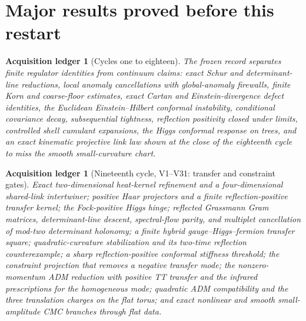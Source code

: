 \documentclass[11pt]{article}
\newtheorem{ledger}[theorem]{Acquisition ledger}
\theoremstyle{remark}
\begin{document}
\section{Major results proved before this restart}
\label{sec:v20v1-summary}

\begin{ledger}[Cycles one to eighteen]
\label{led:v20v1-legacy}
The frozen record separates finite regulator identities from continuum
claims: exact Schur and determinant-line reductions, local anomaly
cancellations with global-anomaly firewalls, finite Korn and
coarse-floor estimates, exact Cartan and Einstein-divergence defect
identities, the Euclidean Einstein--Hilbert conformal instability,
conditional covariance decay, subsequential tightness, reflection
positivity closed under limits, controlled shell cumulant expansions,
the Higgs conformal response on trees, and an exact kinematic
projective link law shown at the close of the eighteenth cycle to miss
the smooth small-curvature chart.
\end{ledger}

\begin{ledger}[Nineteenth cycle, V1--V31: transfer and constraint gates]
\label{led:v20v1-early}
Exact two-dimensional heat-kernel refinement and a four-dimensional
shared-link intertwiner; positive Haar projectors and a finite
reflection-positive transfer kernel; the Fock-positive Higgs hinge;
reflected Grassmann Gram matrices, determinant-line descent, spectral-flow
parity, and multiplet cancellation of mod-two determinant holonomy; a
finite hybrid gauge--Higgs--fermion transfer square; quadratic-curvature
stabilization and its two-time reflection counterexample; a sharp
reflection-positive conformal stiffness threshold; the constraint
projection that removes a negative transfer mode; the nonzero-momentum
ADM reduction with positive TT transfer and the infrared prescriptions
for the homogeneous mode; quadratic ADM compatibility and the three
translation charges on the flat torus; and exact nonlinear and smooth
small-amplitude CMC branches through flat data.
\end{ledger}
\end{document}
